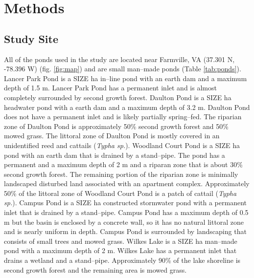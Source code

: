 \section{Methods}
\subsection{Study Site}
All of the ponds used in the study are located near Farmville, VA (37.301 N, -78.396 W) (fig. \ref{fig:map}) and are small man--made ponds (Table \ref{tab:ponds}). Lancer Park Pond is a SIZE ha in--line pond with an earth dam and a maximum depth of 1.5 m. Lancer Park Pond has a permanent inlet and is almost completely surrounded by second growth forest. Daulton Pond is a SIZE ha headwater pond with a earth dam and a maximum depth of 3.2 m. Daulton Pond does not have a permanent inlet and is likely partially spring--fed. The riparian zone of Daulton Pond is approximately 50\% second growth forest and 50\% mowed grass. The littoral zone of Daulton Pond is mostly covered in an unidentified reed and cattails (\emph{Typha sp.}). Woodland Court Pond is a SIZE ha pond with an earth dam that is drained by a stand--pipe. The pond has a permanent and a maximum depth of 2 m and a riparan zone that is about 30\% second growth forest. The remaining portion of the riparian zone is minimally landscaped disturbed land associated with an apartment complex. Approximately 50\% of the littoral zone of Woodland Court Pond is a patch of cattail (\emph{Typha sp.}). Campus Pond is a SIZE ha constructed stormwater pond with a permanent inlet that is drained by a stand--pipe. Campus Pond has a maximum depth of 0.5 m but the basin is enclosed by a concrete wall, so it has no natural littoral zone and is nearly uniform in depth. Campus Pond is surrounded by landscaping that consists of small trees and mowed grass. Wilkes Lake is a SIZE ha man--made pond with a maximum depth of 2 m. Wilkes Lake has a permanent inlet that drains a wetland and a stand--pipe. Approximately 90\% of the lake shoreline is second growth forest and the remaining area is mowed grass.


    
